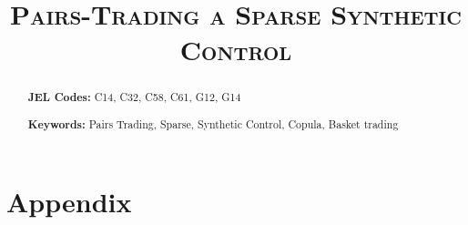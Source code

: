 \documentclass[12pt,a4paper]{article}
\title{
\textsc{
\Large 
Pairs-Trading a Sparse Synthetic Control 
}
}
\author[1]{
{  
{
}
}
}
\date{}
\begin{document}
\maketitle
\thispagestyle{empty}
\begin{abstract}
 

\bx 
\noindent\textbf{JEL Codes:} C14, C32, C58, C61, G12, G14

\mx 
\noindent\textbf{Keywords:} Pairs Trading, Sparse, Synthetic Control, Copula, Basket trading
\end{abstract}

\newpage
\setcounter{page}{1}
















\newpage
\processdelayedfloats 
\renewcommand{\thefigure}{A\arabic{figure}} 
\renewcommand{\thetable}{A\arabic{table}}

\appendix
\newpage
\section{Appendix}

\end{document}
